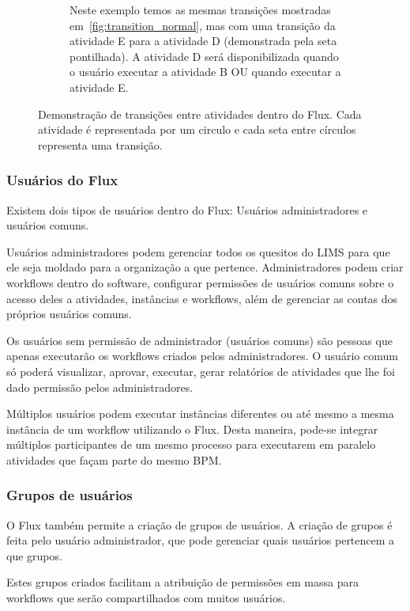 \begin{figure}
\begin{subfigure}[b]{0.45\textwidth}
        \caption{Neste exemplo temos as mesmas transições mostradas em~\ref{fig:transition_normal}, mas com uma transição da atividade E para a atividade D (demonstrada pela seta pontilhada). A atividade D será disponibilizada quando o usuário executar a atividade B OU quando executar a atividade E.}
        \label{fig:transition_ref}
    \end{subfigure}
    \caption{Demonstração de transições entre atividades dentro do Flux. Cada atividade é representada por um circulo e cada seta entre círculos representa uma transição.}
    \label{fig:transitions}
\end{figure}

\subsubsection{Usuários do Flux}

Existem dois tipos de usuários dentro do Flux: Usuários administradores e usuários comuns.

Usuários administradores podem gerenciar todos os quesitos do LIMS para que ele seja moldado para a organização a que pertence. Administradores podem criar workflows dentro do software, configurar permissões de usuários comuns sobre o acesso deles a atividades, instâncias e workflows, além de gerenciar as contas dos próprios usuários comuns.

Os usuários sem permissão de administrador (usuários comuns) são pessoas que apenas executarão os workflows criados pelos administradores. O usuário comum só poderá visualizar, aprovar, executar, gerar relatórios de atividades que lhe foi dado permissão pelos administradores.

Múltiplos usuários podem executar instâncias diferentes ou até mesmo a mesma instância de um workflow utilizando o Flux. Desta maneira, pode-se integrar múltiplos participantes de um mesmo processo para executarem em paralelo atividades que façam parte do mesmo BPM.

\subsubsection{Grupos de usuários}

O Flux também permite a criação de grupos de usuários. A criação de grupos é feita pelo usuário administrador, que pode gerenciar quais usuários pertencem a que grupos.

Estes grupos criados facilitam a atribuição de permissões em massa para workflows que serão compartilhados com muitos usuários.


